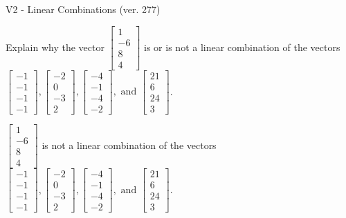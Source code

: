 \begin{exercise}
  \begin{exerciseTitle}V2 - Linear Combinations (ver. 277)\end{exerciseTitle}
  \begin{exerciseStatement}
    Explain why the vector \(\left[\begin{array}{c}
1 \\
-6 \\
8 \\
4
\end{array}\right]\)  is or is not a linear 
	combination of the vectors \(\left[\begin{array}{c}
-1 \\
-1 \\
-1 \\
-1
\end{array}\right] , \left[\begin{array}{c}
-2 \\
0 \\
-3 \\
2
\end{array}\right] , \left[\begin{array}{c}
-4 \\
-1 \\
-4 \\
-2
\end{array}\right] , \text{ and } \left[\begin{array}{c}
21 \\
6 \\
24 \\
3
\end{array}\right]\).
	


  \end{exerciseStatement}
  \begin{exerciseAnswer}
   \(\left[\begin{array}{c}
1 \\
-6 \\
8 \\
4
\end{array}\right]\) 
  	 is not  
	a linear combination of the vectors \(\left[\begin{array}{c}
-1 \\
-1 \\
-1 \\
-1
\end{array}\right] , \left[\begin{array}{c}
-2 \\
0 \\
-3 \\
2
\end{array}\right] , \left[\begin{array}{c}
-4 \\
-1 \\
-4 \\
-2
\end{array}\right] , \text{ and } \left[\begin{array}{c}
21 \\
6 \\
24 \\
3
\end{array}\right]\).


\end{exerciseAnswer}
\end{exercise}
